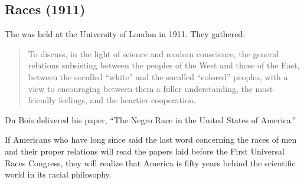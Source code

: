 \documentclass[letterpaper,10pt,english]{jupyterBook}
\begin{document}
\subsection{Races (1911)}
\label{\detokenize{Volumes/02/04/races:races-1911}}\label{\detokenize{Volumes/02/04/races::doc}}
\begin{sphinxShadowBox}
\sphinxstylesidebartitle{}

\sphinxAtStartPar
The  was held at the University of London in 1911. They gathered:
\begin{quote}

\sphinxAtStartPar
To discuss, in the light of science and modern conscience, the general relations subsisting between the peoples of the West and those of the East, between the so\sphinxhyphen{}called “white” and the so\sphinxhyphen{}called “colored” peoples, with a view to encouraging between them a fuller understanding, the most friendly feelings, and the heartier co\sphinxhyphen{}operation.
\end{quote}

\sphinxAtStartPar
Du Bois delivered his paper, “The Negro Race in the United States of America.”
\end{sphinxShadowBox}

\sphinxAtStartPar
If Americans who have long since said the last word con­cerning the races of men and their proper relations will read the papers laid before the First Universal Races Congress, they will realize that America is fifty years behind the scientific world in its racial philosophy.
\end{document}
